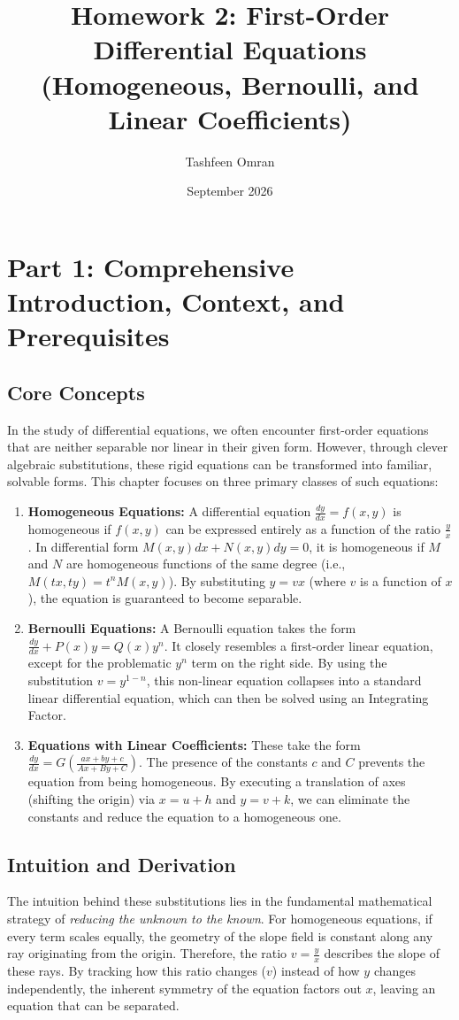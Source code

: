 \documentclass[11pt]{article}
\title{\textbf{Homework 2: First-Order Differential Equations\\(Homogeneous, Bernoulli, and Linear Coefficients)}}
\author{Tashfeen Omran}
\date{September 2026}
\begin{document}
\maketitle
\tableofcontents
\newpage

\section{Part 1: Comprehensive Introduction, Context, and Prerequisites}

\subsection{Core Concepts}
In the study of differential equations, we often encounter first-order equations that are neither separable nor linear in their given form. However, through clever algebraic substitutions, these rigid equations can be transformed into familiar, solvable forms. This chapter focuses on three primary classes of such equations:
\begin{enumerate}
    \item \textbf{Homogeneous Equations:} A differential equation $\frac{dy}{dx} = f(x,y)$ is homogeneous if $f(x,y)$ can be expressed entirely as a function of the ratio $\frac{y}{x}$. In differential form $M(x,y)dx + N(x,y)dy = 0$, it is homogeneous if $M$ and $N$ are homogeneous functions of the same degree (i.e., $M(tx, ty) = t^n M(x,y)$). By substituting $y = vx$ (where $v$ is a function of $x$), the equation is guaranteed to become separable.
    \item \textbf{Bernoulli Equations:} A Bernoulli equation takes the form $\frac{dy}{dx} + P(x)y = Q(x)y^n$. It closely resembles a first-order linear equation, except for the problematic $y^n$ term on the right side. By using the substitution $v = y^{1-n}$, this non-linear equation collapses into a standard linear differential equation, which can then be solved using an Integrating Factor.
    \item \textbf{Equations with Linear Coefficients:} These take the form $\frac{dy}{dx} = G\left(\frac{ax + by + c}{Ax + By + C}\right)$. The presence of the constants $c$ and $C$ prevents the equation from being homogeneous. By executing a translation of axes (shifting the origin) via $x = u + h$ and $y = v + k$, we can eliminate the constants and reduce the equation to a homogeneous one.
\end{enumerate}

\subsection{Intuition and Derivation}
The intuition behind these substitutions lies in the fundamental mathematical strategy of \textit{reducing the unknown to the known}. 
For homogeneous equations, if every term scales equally, the geometry of the slope field is constant along any ray originating from the origin. Therefore, the ratio $v = \frac{y}{x}$ describes the slope of these rays. By tracking how this ratio changes ($v$) instead of how $y$ changes independently, the inherent symmetry of the equation factors out $x$, leaving an equation that can be separated.
\end{document}
